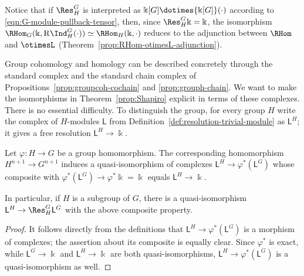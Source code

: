 Notice that if $\Res^G_H$ is interpreted as
$\Bbbk[G]\dotimes{\Bbbk[G]}(\cdot)$ according to
\eqref{eqn:G-module-pullback-tensor}, then, since
$\Res^G_H\Bbbk=\Bbbk$, the isomorphism
$\RHom_G(\Bbbk,\mathrm{R}\Ind^G_H(\cdot))
\simeq\RHom_H(\Bbbk,\cdot)$ reduces to the adjunction between $\RHom$ and
$\otimesL$ (Theorem~\ref{prop:RHom-otimesL-adjunction}).

Group cohomology and homology can be described concretely through the standard
complex and the standard chain complex of
Propositions~\ref{prop:groupcoh-cochain} and \ref{prop:grouph-chain}. We want
to make the isomorphisms in Theorem~\ref{prop:Shapiro} explicit in terms of
these complexes. There is no essential difficulty. To distinguish the group,
for every group $H$ write the complex of $H$-modules $\mathsf{L}$ from
Definition~\ref{def:resolution-trivial-module} as $\mathsf{L}^H$; it gives a
free resolution $\mathsf{L}^H\to\Bbbk$.

\begin{lemma}\label{prop:Shapiro-alpha-beta}
	Let $\varphi:H\to G$ be a group homomorphism. The corresponding
	homomorphism $H^{n+1}\to G^{n+1}$ induces a quasi-isomorphism of complexes
	$\mathsf{L}^H\to\varphi^*(\mathsf{L}^G)$ whose composite with
	$\varphi^*(\mathsf{L}^G)\to\varphi^*\Bbbk=\Bbbk$ equals
	$\mathsf{L}^H\to\Bbbk$.

	In particular, if $H$ is a subgroup of $G$, there is a quasi-isomorphism
	$\mathsf{L}^H\to\Res^G_H\mathsf{L}^G$ with the above composite property.
\end{lemma}
\begin{proof}
	It follows directly from the definitions that
	$\mathsf{L}^H\to\varphi^*(\mathsf{L}^G)$ is a morphism of complexes; the
	assertion about its composite is equally clear. Since $\varphi^*$ is
	exact, while $\mathsf{L}^G\to\Bbbk$ and $\mathsf{L}^H\to\Bbbk$ are both
	quasi-isomorphisms, $\mathsf{L}^H\to\varphi^*(\mathsf{L}^G)$ is a
	quasi-isomorphism as well.
\end{proof}

